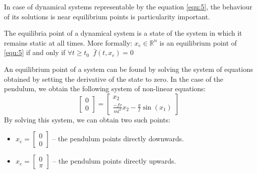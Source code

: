 In case of dynamical systems representable by the equation \ref{equ:5}, the behaviour of its solutions is near equilibrium points is particularity important.
{
    The equilibria point of a dynamical system is a state of the system in which it remains static at all times. 
    More formally: $x_e \in \mathbb{R}^{n}$ is an equilibrium point of \ref{equ:5} if and only if $\forall t \ge t_0  \;\; \bar{f}(t,x_e) = 0$ 
    {
        An equilibrium point of a system can be found by solving the system of equations obtained by setting the derivative of the state to zero. In the case of the pendulum, we obtain the following system of non-linear equations:
\begin{equation}
    \label{pendeq}
    \begin{bmatrix}
        0 \\
        0
    \end{bmatrix}
    =
    \begin{bmatrix}
        x_2 \\
        \frac{-fv}{ml^2}x_2 - \frac{g}{l}\sin(x_1)
    \end{bmatrix}
\end{equation}
By solving this system, we can obtain two such points:
\begin{itemize}
        \item $x_e = \begin{bmatrix}
            0  \\
            0
        \end{bmatrix}$ -- the pendulum points directly downwards.

    \item $x_e = \begin{bmatrix}
            0 \\
            \pi
    \end{bmatrix}$ -- the pendulum points directly upwards.
\end{itemize}
}

    
}
